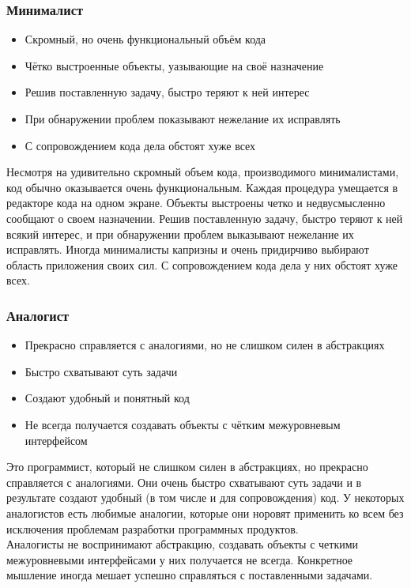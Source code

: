 \documentclass{../industrial-development}
\begin{document}
{\begin{frame} \frametitle{Минималист}
	\begin{itemize}
		\item Скромный, но очень функциональный объём кода
		\item Чётко выстроенные объекты, уазывающие на своё назначение
		\item Решив поставленную задачу, быстро теряют к ней интерес
		\item При обнаружении проблем показывают нежелание их исправлять
		\item  С сопровождением кода дела обстоят хуже всех
	\end{itemize}
\end{frame}
\lecturenotes
	 Несмотря на удивительно скромный объем кода, производимого минималистами, код обычно оказывается очень функциональным. Каждая процедура умещается в редакторе кода на одном экране. Объекты выстроены четко и недвусмысленно сообщают о своем назначении. 
	Решив поставленную задачу, быстро теряют к ней всякий интерес, и при обнаружении проблем выказывают нежелание их исправлять. Иногда минималисты капризны и очень придирчиво выбирают область приложения своих сил. С сопровождением кода дела у них обстоят хуже всех.

\begin{frame} \frametitle{Аналогист}
	\begin{itemize}
		\item Прекрасно справляется с аналогиями, но не слишком силен в абстракциях
		\item Быстро схватывают суть задачи
		\item Создают удобный и понятный код
		\item Не всегда получается создавать объекты с чётким межуровневым интерфейсом
	\end{itemize}
\end{frame}
\lecturenotes
 Это программист, который не слишком силен в абстракциях, но прекрасно справляется с аналогиями. Они очень быстро схватывают суть задачи и в результате создают удобный (в том числе и для сопровождения) код. У некоторых аналогистов есть любимые аналогии, которые они норовят применить ко всем без исключения проблемам разработки программных продуктов.  \\ 
	Аналогисты не воспринимают абстракцию, создавать объекты с четкими межуровневыми интерфейсами у них получается не всегда. Конкретное мышление иногда мешает успешно справляться с поставленными задачами.

}
\end{document}

